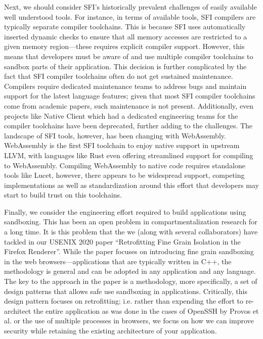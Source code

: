 Next, we should consider SFI's historically prevalent challenges of easily 
available well understood tools.
%
For instance, in terms of available tools, SFI compilers are typically separate 
compiler toolchains.
%
This is because SFI uses automatically inserted dynamic checks to ensure that 
all memory accesses are restricted to a given memory region---these requires 
explicit compiler support.
%
However, this means that developers must be aware of and use multiple compiler 
toolchains to sandbox parts of their application.
%
This decision is further complicated by the fact that SFI compiler toolchains 
often do not get sustained maintenance.
%
Compilers require dedicated maintenance teams to address bugs and maintain 
support for the latest language features; given that most SFI compiler 
toolchains come from academic papers, such maintenance is not present.
%
Additionally, even projects like Native Client which had a dedicated 
engineering teams for the compiler toolchains have been deprecated, further 
adding to the challenges.
%
The landscape of SFI tools, however, has been changing with WebAssembly.
%
WebAssembly is the first SFI toolchain to enjoy native support in upstream 
LLVM, with languages like Rust even offering streamlined support for compiling 
to WebAssembly.
%
Compiling WebAssembly to native code requires standalone tools like Lucet, 
however, there appears to be widespread support, competing implementations as 
well as standardization around this effort that developers may start to build 
trust on this toolchains.

Finally, we consider the engineering effort required to build applications 
using sandboxing.
%
This has been an open problem in compartmentalization research for a long time. 
%
It is this problem that the we (along with several collaborators) have tackled 
in our USENIX 2020 paper ``Retrofitting Fine Grain Isolation in the Firefox 
Renderer''.
%
While the paper focuses on introducing fine grain sandboxing in the web 
browsers---applications that are typically written in C++, the methodology is 
general and can be adopted in any application and any language.
%
The key to the approach in the paper is a methodology, more specifically, a set 
of design patterns that allows safe use sandboxing in applications.
%
Critically, this design pattern focuses on retrofitting; i.e. rather than 
expending the effort to re-architect the entire application as was done in the 
cases of OpenSSH by Provos et al. or the use of multiple processes in browsers, 
we focus on how we can improve security while retaining the existing 
architecture of your application.


